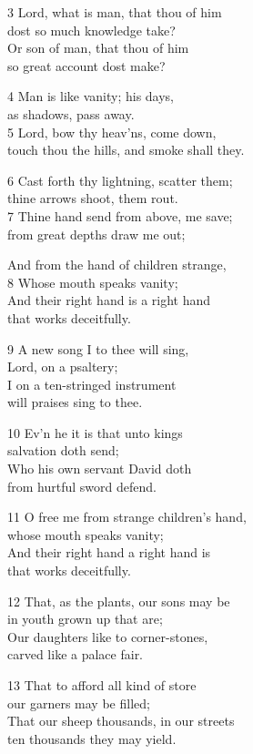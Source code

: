 3 Lord, what is man, that thou of him\\
dost so much knowledge take?\\
Or son of man, that thou of him\\
so great account dost make?

4 Man is like vanity; his days,\\
as shadows, pass away.\\
5 Lord, bow thy heav’ns, come down,\\
touch thou the hills, and smoke shall they.

6 Cast forth thy lightning, scatter them;\\
thine arrows shoot, them rout.\\
7 Thine hand send from above, me save;\\
from great depths draw me out;

And from the hand of children strange,\\
8 Whose mouth speaks vanity;\\
And their right hand is a right hand\\
that works deceitfully.

9 A new song I to thee will sing,\\
Lord, on a psaltery;\\
I on a ten-stringed instrument\\
will praises sing to thee.

10 Ev’n he it is that unto kings\\
salvation doth send;\\
Who his own servant David doth\\
from hurtful sword defend.

11 O free me from strange children’s hand,\\
whose mouth speaks vanity;\\
And their right hand a right hand is\\
that works deceitfully.

12 That, as the plants, our sons may be\\
in youth grown up that are;\\
Our daughters like to corner-stones,\\
carved like a palace fair.

13 That to afford all kind of store\\
our garners may be filled;\\
That our sheep thousands, in our streets\\
ten thousands they may yield.

